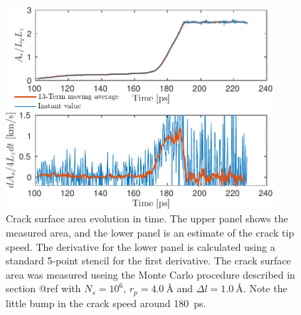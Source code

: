 \begin{figure}
\centering
\includegraphics[width=10cm]{../figures/thesis/crack_area_evolution_1048.pdf}
\caption{Crack surface area evolution in time. The upper panel shows the measured area, and the lower panel is an estimate of the crack tip speed. The derivative for the lower panel is calculated using a standard 5-point stencil for the first derivative. The crack surface area was measured useing the Monte Carlo procedure described in section @ref with $N_s = 10^6$, $r_p = \SI{4.0}{\angstrom}$ and $\Delta l = \SI{1.0}{\angstrom}$. Note the little bump in the crack speed around \SI{180}{\pico\second}.}
\label{fig:crack_area_evolution_1048}
\end{figure}

